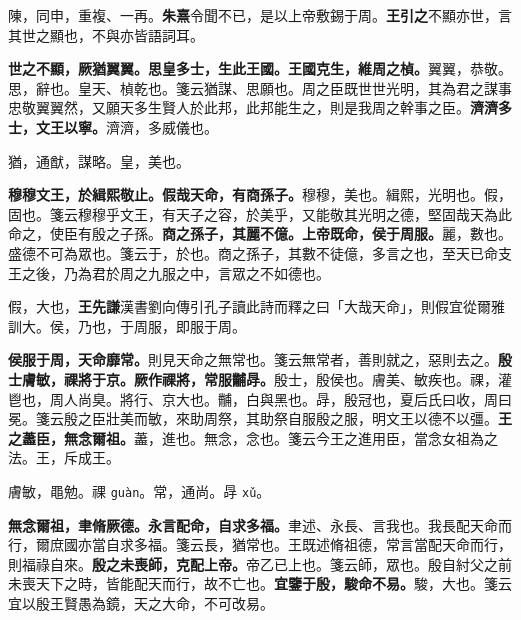 \begin{quoting}陳，同申，重複、一再。\textbf{朱熹}令聞不已，是以上帝敷錫于周。\textbf{王引之}不顯亦世，言其世之顯也，不與亦皆語詞耳。\end{quoting}

\textbf{世之不顯，厥猶翼翼。思皇多士，生此王國。王國克生，維周之楨。}{\footnotesize 翼翼，恭敬。思，辭也。皇天、楨乾也。箋云猶謀、思願也。周之臣既世世光明，其為君之謀事忠敬翼翼然，又願天多生賢人於此邦，此邦能生之，則是我周之幹事之臣。}\textbf{濟濟多士，文王以寧。}{\footnotesize 濟濟，多威儀也。}

\begin{quoting}猶，通猷，謀略。皇，美也。\end{quoting}

\textbf{穆穆文王，於緝熙敬止。假哉天命，有商孫子。}{\footnotesize 穆穆，美也。緝熙，光明也。假，固也。箋云穆穆乎文王，有天子之容，於美乎，又能敬其光明之德，堅固哉天為此命之，使臣有殷之子孫。}\textbf{商之孫子，其麗不億。上帝既命，侯于周服。}{\footnotesize 麗，數也。盛德不可為眾也。箋云于，於也。商之孫子，其數不徒億，多言之也，至天已命支王之後，乃為君於周之九服之中，言眾之不如德也。}

\begin{quoting}假，大也，\textbf{王先謙}漢書劉向傳引孔子讀此詩而釋之曰「大哉天命」，則假宜從爾雅訓大。侯，乃也，于周服，即服于周。\end{quoting}

\textbf{侯服于周，天命靡常。}{\footnotesize 則見天命之無常也。箋云無常者，善則就之，惡則去之。}\textbf{殷士膚敏，祼將于京。厥作祼將，常服黼冔。}{\footnotesize 殷士，殷侯也。膚美、敏疾也。祼，灌鬯也，周人尚臭。將行、京大也。黼，白與黑也。冔，殷冠也，夏后氏曰收，周曰冕。箋云殷之臣壯美而敏，來助周祭，其助祭自服殷之服，明文王以德不以彊。}\textbf{王之藎臣，無念爾祖。}{\footnotesize 藎，進也。無念，念也。箋云今王之進用臣，當念女祖為之法。王，斥成王。}

\begin{quoting}膚敏，黽勉。祼 \texttt{guàn}。常，通尚。冔 \texttt{xǔ}。\end{quoting}

\textbf{無念爾祖，聿脩厥德。永言配命，自求多福。}{\footnotesize 聿述、永長、言我也。我長配天命而行，爾庶國亦當自求多福。箋云長，猶常也。王既述脩祖德，常言當配天命而行，則福祿自來。}\textbf{殷之未喪師，克配上帝。}{\footnotesize 帝乙已上也。箋云師，眾也。殷自紂父之前未喪天下之時，皆能配天而行，故不亡也。}\textbf{宜鑒于殷，駿命不易。}{\footnotesize 駿，大也。箋云宜以殷王賢愚為鏡，天之大命，不可改易。}


